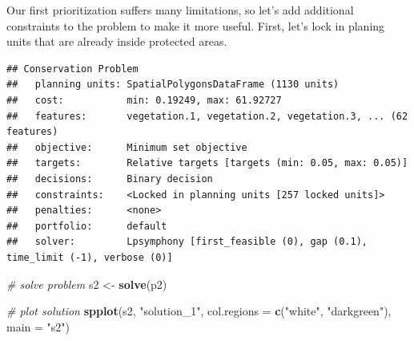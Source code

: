 \documentclass[12pt,]{book}
\newenvironment{Shaded}{\begin{snugshade}}{\end{snugshade}}
\newcommand{\KeywordTok}[1]{\textcolor[rgb]{0.13,0.29,0.53}{\textbf{#1}}}
\newcommand{\DataTypeTok}[1]{\textcolor[rgb]{0.13,0.29,0.53}{#1}}
\newcommand{\FloatTok}[1]{\textcolor[rgb]{0.00,0.00,0.81}{#1}}
\newcommand{\StringTok}[1]{\textcolor[rgb]{0.31,0.60,0.02}{#1}}
\newcommand{\CommentTok}[1]{\textcolor[rgb]{0.56,0.35,0.01}{\textit{#1}}}
\newcommand{\OtherTok}[1]{\textcolor[rgb]{0.56,0.35,0.01}{#1}}
\newcommand{\OperatorTok}[1]{\textcolor[rgb]{0.81,0.36,0.00}{\textbf{#1}}}
\newcommand{\NormalTok}[1]{#1}
\begin{document}
Our first prioritization suffers many limitations, so let's add
additional constraints to the problem to make it more useful. First,
let's lock in planing units that are already inside protected areas.

\begin{Shaded}
\end{Shaded}

\begin{verbatim}
## Conservation Problem
##   planning units: SpatialPolygonsDataFrame (1130 units)
##   cost:           min: 0.19249, max: 61.92727
##   features:       vegetation.1, vegetation.2, vegetation.3, ... (62 features)
##   objective:      Minimum set objective 
##   targets:        Relative targets [targets (min: 0.05, max: 0.05)]
##   decisions:      Binary decision 
##   constraints:    <Locked in planning units [257 locked units]>
##   penalties:      <none>
##   portfolio:      default
##   solver:         Lpsymphony [first_feasible (0), gap (0.1), time_limit (-1), verbose (0)]
\end{verbatim}

\begin{Shaded}
\begin{Highlighting}[]
\CommentTok{# solve problem}
\NormalTok{s2 <-}\StringTok{ }\KeywordTok{solve}\NormalTok{(p2)}

\CommentTok{# plot solution}
\KeywordTok{spplot}\NormalTok{(s2, }\StringTok{"solution_1"}\NormalTok{, }\DataTypeTok{col.regions =} \KeywordTok{c}\NormalTok{(}\StringTok{"white"}\NormalTok{, }\StringTok{"darkgreen"}\NormalTok{), }\DataTypeTok{main =} \StringTok{"s2"}\NormalTok{)}
\end{Highlighting}
\end{Shaded}
\end{document}
